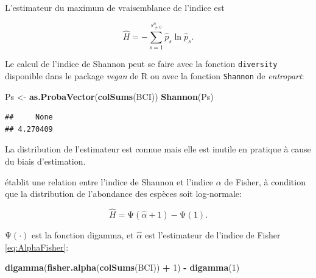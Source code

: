 \documentclass[
  11pt,
  french,
  a4paper,
  extrafontsizes,onecolumn,openright
  ]{memoir}
\newenvironment{Shaded}{\begin{snugshade}}{\end{snugshade}}
\newcommand{\DecValTok}[1]{\textcolor[rgb]{0.00,0.00,0.81}{#1}}
\newcommand{\KeywordTok}[1]{\textcolor[rgb]{0.13,0.29,0.53}{\textbf{#1}}}
\newcommand{\NormalTok}[1]{#1}
\newcommand{\OperatorTok}[1]{\textcolor[rgb]{0.81,0.36,0.00}{\textbf{#1}}}
\newcommand{\StringTok}[1]{\textcolor[rgb]{0.31,0.60,0.02}{#1}}
\begin{document}
L'estimateur du maximum de vraisemblance de l'indice est

\begin{equation}
  \label{eq:EstShannonML}
  \hat{H} = -\sum^{s^{n}_{\ne 0}}_{s=1}{\hat{p}_s \ln{\hat{p}_s}}.
\end{equation}

Le calcul de l'indice de Shannon peut se faire avec la fonction \texttt{diversity} disponible dans le package \emph{vegan} de R ou avec la fonction \texttt{Shannon} de \emph{entropart}:

\scriptsize

\begin{Shaded}
\begin{Highlighting}[]
\NormalTok{Ps <-}\StringTok{ }\KeywordTok{as.ProbaVector}\NormalTok{(}\KeywordTok{colSums}\NormalTok{(BCI))}
\KeywordTok{Shannon}\NormalTok{(Ps)}
\end{Highlighting}
\end{Shaded}

\begin{verbatim}
##     None 
## 4.270409
\end{verbatim}

\normalsize

La distribution de l'estimateur est connue \autocite{Hutcheson1970} mais elle est inutile en pratique à cause du biais d'estimation.

\textcite{Bulmer1974} établit une relation entre l'indice de Shannon et l'indice \(\alpha\) de Fisher, à condition que la distribution de l'abondance des espèces soit log-normale:

\begin{equation}
  \label{eq:Bulmer1974}
  \hat{H} = \mathrm{\Psi}\left(\hat{\alpha}+1\right) - \mathrm{\Psi}\left(1\right).
\end{equation}

\(\mathrm{\Psi}(\cdot)\) est la fonction digamma, et \(\hat{\alpha}\) est l'estimateur de l'indice de Fisher \eqref{eq:AlphaFisher}:

\scriptsize

\begin{Shaded}
\begin{Highlighting}[]
\KeywordTok{digamma}\NormalTok{(}\KeywordTok{fisher.alpha}\NormalTok{(}\KeywordTok{colSums}\NormalTok{(BCI)) }\OperatorTok{+}\StringTok{ }\DecValTok{1}\NormalTok{) }\OperatorTok{-}\StringTok{ }\KeywordTok{digamma}\NormalTok{(}\DecValTok{1}\NormalTok{)}
\end{Highlighting}
\end{Shaded}
\end{document}
